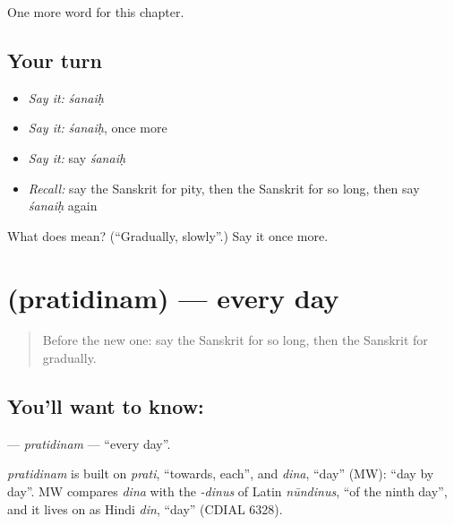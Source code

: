 \begin{grammarlens}[title={What you've built}]
One more word for this chapter.
\end{grammarlens}

\subsection*{Your turn}
\begin{itemize}
\raggedright
  \item \emph{Say it:} \emph{śanaiḥ}
  \item \emph{Say it:} \emph{śanaiḥ}, once more
  \item \emph{Say it:} say \emph{śanaiḥ}
  \item \emph{Recall:} say the Sanskrit for pity, then the Sanskrit for so long, then say \emph{śanaiḥ} again
\end{itemize}

\begin{tcolorbox}[breakable,colback=teal!4,colframe=teal!35!black,title={Before you move on}]
What does  mean? (\textquotedblleft{}Gradually, slowly\textquotedblright{}.) Say it once more.
\end{tcolorbox}
\section[\texorpdfstring{\sk{प्रतिदिनम्} (pratidinam)}{प्रतिदिनम् (pratidinam)}]{ (pratidinam) — every day}

\label{lesson:SA-C240-pratidinam}



\begin{quote}
Before the new one: say the Sanskrit for so long, then the Sanskrit for gradually.
\end{quote}

\subsection*{You'll want to know: }
\textbf{} — \emph{pratidinam} — \textquotedblleft{}every day\textquotedblright{}.

\begin{cousinweb}
\emph{pratidinam} is built on \emph{prati}, \textquotedblleft{}towards, each\textquotedblright{}, and \emph{dina}, \textquotedblleft{}day\textquotedblright{} (MW): \textquotedblleft{}day by day\textquotedblright{}. MW compares \emph{dina} with the \emph{-dinus} of Latin \emph{nūndinus}, \textquotedblleft{}of the ninth day\textquotedblright{}, and it lives on as Hindi \emph{din}, \textquotedblleft{}day\textquotedblright{} (CDIAL 6328).
\end{cousinweb}

